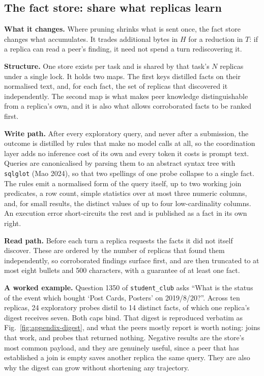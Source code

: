 \documentclass[conference]{IEEEtran}
\begin{document}
\subsection{The fact store: share what replicas learn}\label{sec:p3}

\textbf{What it changes.} Where pruning shrinks what is sent once, the fact store
changes what accumulates. It trades additional bytes in $H$ for a reduction in
$T$: if a replica can read a peer's finding, it need not spend a turn
rediscovering it.

\textbf{Structure.} One store exists per task and is shared by that task's $N$
replicas under a single lock. It holds two maps. The first keys distilled facts on their
normalised text, and, for each fact, the set of replicas that discovered it
independently. The second map is what makes peer knowledge distinguishable from
a replica's own, and it is also what allows corroborated facts to be ranked
first.

\textbf{Write path.} After every exploratory query, and never after a
submission, the outcome is distilled by rules that make no model calls at all, so the
coordination layer adds no inference cost of its own and every token it costs is
prompt text. Queries are canonicalised by parsing them to an
abstract syntax tree with \texttt{sqlglot} (Mao 2024), so that two spellings of
one probe collapse to a single fact. The rules emit a normalised form of the
query itself,
up to two working join predicates, a row count, simple statistics over at most
three numeric columns, and, for small results, the distinct values of up to four
low-cardinality columns. An execution error short-circuits the rest and is
published as a fact in its own right.

\textbf{Read path.} Before each turn a replica requests the facts it did not
itself discover. These are ordered by the number of replicas that found them
independently, so corroborated findings surface first, and are then truncated to
at most eight bullets and 500 characters, with a guarantee of at least one fact.

\textbf{A worked example.} Question 1350 of \texttt{student\_club} asks ``What
is the status of the event which bought `Post Cards, Posters' on 2019/8/20?''.
Across ten replicas, 24 exploratory probes distil to 14 distinct facts, of which
one replica's digest receives seven. Both caps bind. That digest is reproduced
verbatim as Fig.~\ref{fig:appendix-digest}, and what the peers mostly report is
worth noting: joins that work, and probes that returned nothing. Negative
results are the store's most common payload, and they are genuinely useful,
since a peer that has established a join is empty saves another replica the same
query. They are also why the digest can grow without shortening any
trajectory.
\end{document}
